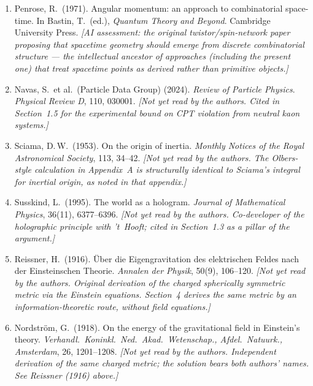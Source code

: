 \documentclass[12pt]{article}
\begin{document}
\begin{enumerate}
  \item Penrose, R.\ (1971).
        Angular momentum: an approach to combinatorial space-time.
        In Bastin, T.\ (ed.),
        \textit{Quantum Theory and Beyond}.
        Cambridge University Press.
        \textit{[AI assessment: the original twistor/spin-network paper
        proposing that spacetime geometry should emerge from discrete
        combinatorial structure --- the intellectual ancestor of
        approaches (including the present one) that treat spacetime
        points as derived rather than primitive objects.]}

  \item Navas, S.\ et al.\ (Particle Data Group) (2024).
        \textit{Review of Particle Physics}.
        \textit{Physical Review D}, 110, 030001.
        \textit{[Not yet read by the authors. Cited in Section~1.5 for
        the experimental bound on CPT violation from neutral kaon
        systems.]}

  \item Sciama, D.\,W.\ (1953).
        On the origin of inertia.
        \textit{Monthly Notices of the Royal Astronomical Society},
        113, 34--42.
        \textit{[Not yet read by the authors. The Olbers-style
        calculation in Appendix~A is structurally identical to
        Sciama's integral for inertial origin, as noted in that
        appendix.]}

  \item Susskind, L.\ (1995).
        The world as a hologram.
        \textit{Journal of Mathematical Physics}, 36(11), 6377--6396.
        \textit{[Not yet read by the authors. Co-developer of the
        holographic principle with 't~Hooft; cited in Section~1.3
        as a pillar of the argument.]}

  \item Reissner, H.\ (1916).
        \"{U}ber die Eigengravitation des elektrischen Feldes nach der
        Einsteinschen Theorie.
        \textit{Annalen der Physik}, 50(9), 106--120.
        \textit{[Not yet read by the authors. Original derivation of
        the charged spherically symmetric metric via the Einstein
        equations. Section~4 derives the same metric by an
        information-theoretic route, without field equations.]}

  \item Nordstr\"{o}m, G.\ (1918).
        On the energy of the gravitational field in Einstein's theory.
        \textit{Verhandl.\ Koninkl.\ Ned.\ Akad.\ Wetenschap.,
        Afdel.\ Natuurk., Amsterdam}, 26, 1201--1208.
        \textit{[Not yet read by the authors. Independent derivation of
        the same charged metric; the solution bears both authors' names.
        See Reissner (1916) above.]}

\end{enumerate}
\end{document}
